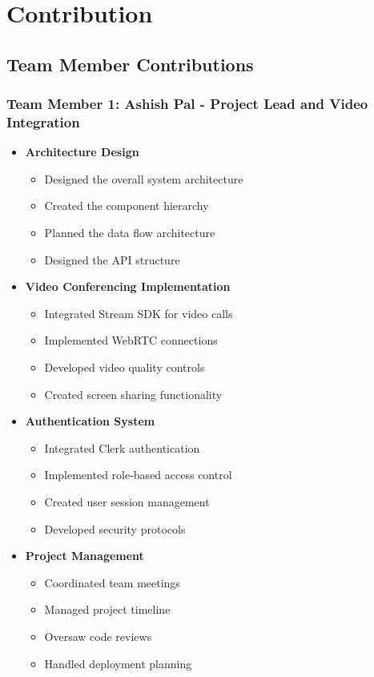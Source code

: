\documentclass[12pt,a4paper]{report}
\begin{document}
\chapter{Contribution}

\section{Team Member Contributions}

\subsection{Team Member 1: Ashish Pal - Project Lead and Video Integration}
\begin{itemize}
    \item \textbf{Architecture Design}
    \begin{itemize}
        \item Designed the overall system architecture
        \item Created the component hierarchy
        \item Planned the data flow architecture
        \item Designed the API structure
    \end{itemize}
    
    \item \textbf{Video Conferencing Implementation}
    \begin{itemize}
        \item Integrated Stream SDK for video calls
        \item Implemented WebRTC connections
        \item Developed video quality controls
        \item Created screen sharing functionality
    \end{itemize}
    
    \item \textbf{Authentication System}
    \begin{itemize}
        \item Integrated Clerk authentication
        \item Implemented role-based access control
        \item Created user session management
        \item Developed security protocols
    \end{itemize}
    
    \item \textbf{Project Management}
    \begin{itemize}
        \item Coordinated team meetings
        \item Managed project timeline
        \item Oversaw code reviews
        \item Handled deployment planning
    \end{itemize}
\end{itemize}
\end{document}
